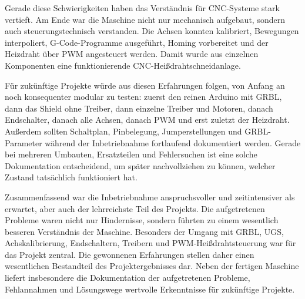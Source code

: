 Gerade diese Schwierigkeiten haben das Verständnis für CNC-Systeme stark vertieft. Am Ende war die Maschine nicht nur mechanisch aufgebaut, sondern auch steuerungstechnisch verstanden. Die Achsen konnten kalibriert, Bewegungen interpoliert, G-Code-Programme ausgeführt, Homing vorbereitet und der Heizdraht über PWM angesteuert werden. Damit wurde aus einzelnen Komponenten eine funktionierende CNC-Heißdrahtschneidanlage.

Für zukünftige Projekte würde aus diesen Erfahrungen folgen, von Anfang an noch konsequenter modular zu testen: zuerst den reinen Arduino mit GRBL, dann das Shield ohne Treiber, dann einzelne Treiber und Motoren, danach Endschalter, danach alle Achsen, danach PWM und erst zuletzt der Heizdraht. Außerdem sollten Schaltplan, Pinbelegung, Jumperstellungen und GRBL-Parameter während der Inbetriebnahme fortlaufend dokumentiert werden. Gerade bei mehreren Umbauten, Ersatzteilen und Fehlersuchen ist eine solche Dokumentation entscheidend, um später nachvollziehen zu können, welcher Zustand tatsächlich funktioniert hat.

Zusammenfassend war die Inbetriebnahme anspruchsvoller und zeitintensiver als erwartet, aber auch der lehrreichste Teil des Projekts. Die aufgetretenen Probleme waren nicht nur Hindernisse, sondern führten zu einem wesentlich besseren Verständnis der Maschine. Besonders der Umgang mit GRBL, UGS, Achskalibrierung, Endschaltern, Treibern und PWM-Heißdrahtsteuerung war für das Projekt zentral. Die gewonnenen Erfahrungen stellen daher einen wesentlichen Bestandteil des Projektergebnisses dar. Neben der fertigen Maschine liefert insbesondere die Dokumentation der aufgetretenen Probleme, Fehlannahmen und Lösungswege wertvolle Erkenntnisse für zukünftige Projekte.
